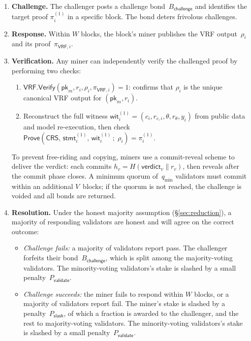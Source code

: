 \begin{enumerate}[nosep]
    \item \textbf{Challenge.} The challenger posts a challenge bond~$B_{\mathsf{challenge}}$ and identifies the target proof $\pi_i^{(1)}$ in a specific block. The bond deters frivolous challenges.

    \item \textbf{Response.} Within $W$ blocks, the block's miner publishes the VRF output~$\rho_i$ and its proof~$\pi_{\mathsf{VRF},i}$.

    \item \textbf{Verification.} Any miner can independently verify the challenged proof by performing two checks:
    \begin{enumerate}[nosep]
        \item $\mathsf{VRF.Verify}(\mathsf{pk}_m, r_i, \rho_i, \pi_{\mathsf{VRF},i}) = 1$:  confirms that $\rho_i$ is the unique canonical VRF output for $(\mathsf{pk}_m, r_i)$.
        \item Reconstruct the full witness $\mathsf{wit}_i^{(1)} = (c_i, r_{c,i}, \theta, r_\theta, y_i)$ from public data and model re-execution, then check \\ $\mathsf{Prove}(\mathsf{CRS},\, \mathsf{stmt}_i^{(1)},\, \mathsf{wit}_i^{(1)}\,;\; \rho_i) = \pi_i^{(1)}$. 
    \end{enumerate}
    To prevent free-riding and copying, miners use a commit-reveal scheme to deliver the verdict: each commits $h_v = H(\mathsf{verdict}_v \parallel r_v)$, then reveals after the commit phase closes. A minimum quorum of~$q_{\min}$ validators must commit within an additional $V$~blocks; if the quorum is not reached, the challenge is voided and all bonds are returned.

    \item \textbf{Resolution.} Under the honest majority assumption (\S\ref{sec:reduction}), a majority of responding validators are honest and will agree on the correct outcome:
    \begin{itemize}[nosep]
        \item \emph{Challenge fails:} a majority of validators report pass. The challenger forfeits their bond~$B_{\mathsf{challenge}}$, which is split among the majority-voting validators. The minority-voting validators's stake is slashed by a small penalty~$P_{\mathsf{validate}}$.
        \item \emph{Challenge succeeds:} the miner fails to respond within $W$ blocks, or a majority of validators report fail. The miner's stake is slashed by a penalty~$P_{\mathsf{slash}}$, of which a fraction is awarded to the challenger, and the rest to majority-voting validators. The minority-voting validators's stake is slashed by a small penalty~$P_{\mathsf{validate}}$.
    \end{itemize}
\end{enumerate}

